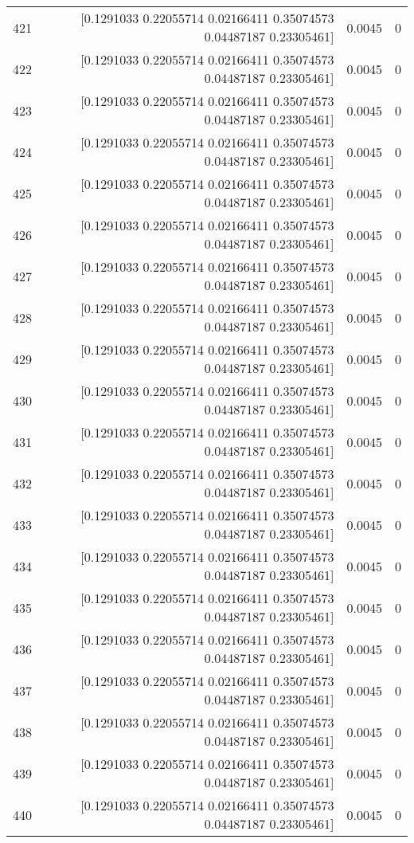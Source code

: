 \begin{longtable}{lrrr}
421 & [0.1291033  0.22055714 0.02166411 0.35074573 0.04487187 0.23305461] & 0.0045 & 0 \\
422 & [0.1291033  0.22055714 0.02166411 0.35074573 0.04487187 0.23305461] & 0.0045 & 0 \\
423 & [0.1291033  0.22055714 0.02166411 0.35074573 0.04487187 0.23305461] & 0.0045 & 0 \\
424 & [0.1291033  0.22055714 0.02166411 0.35074573 0.04487187 0.23305461] & 0.0045 & 0 \\
425 & [0.1291033  0.22055714 0.02166411 0.35074573 0.04487187 0.23305461] & 0.0045 & 0 \\
426 & [0.1291033  0.22055714 0.02166411 0.35074573 0.04487187 0.23305461] & 0.0045 & 0 \\
427 & [0.1291033  0.22055714 0.02166411 0.35074573 0.04487187 0.23305461] & 0.0045 & 0 \\
428 & [0.1291033  0.22055714 0.02166411 0.35074573 0.04487187 0.23305461] & 0.0045 & 0 \\
429 & [0.1291033  0.22055714 0.02166411 0.35074573 0.04487187 0.23305461] & 0.0045 & 0 \\
430 & [0.1291033  0.22055714 0.02166411 0.35074573 0.04487187 0.23305461] & 0.0045 & 0 \\
431 & [0.1291033  0.22055714 0.02166411 0.35074573 0.04487187 0.23305461] & 0.0045 & 0 \\
432 & [0.1291033  0.22055714 0.02166411 0.35074573 0.04487187 0.23305461] & 0.0045 & 0 \\
433 & [0.1291033  0.22055714 0.02166411 0.35074573 0.04487187 0.23305461] & 0.0045 & 0 \\
434 & [0.1291033  0.22055714 0.02166411 0.35074573 0.04487187 0.23305461] & 0.0045 & 0 \\
435 & [0.1291033  0.22055714 0.02166411 0.35074573 0.04487187 0.23305461] & 0.0045 & 0 \\
436 & [0.1291033  0.22055714 0.02166411 0.35074573 0.04487187 0.23305461] & 0.0045 & 0 \\
437 & [0.1291033  0.22055714 0.02166411 0.35074573 0.04487187 0.23305461] & 0.0045 & 0 \\
438 & [0.1291033  0.22055714 0.02166411 0.35074573 0.04487187 0.23305461] & 0.0045 & 0 \\
439 & [0.1291033  0.22055714 0.02166411 0.35074573 0.04487187 0.23305461] & 0.0045 & 0 \\
440 & [0.1291033  0.22055714 0.02166411 0.35074573 0.04487187 0.23305461] & 0.0045 & 0 \\

\end{longtable}
